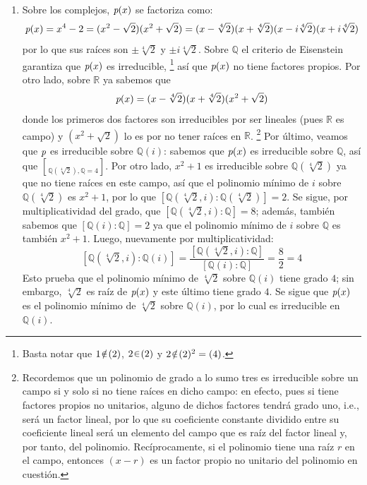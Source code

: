 \begin{sol}\hphantom{x}
\begin{enumerate}[label=\alph*)]
\item 
Sobre los complejos, $\operatorname{\textit{p}}(x)$ se factoriza como:
\[
\operatorname{\textit{p}}(x) = x^4 - 2 = (x^2-\sqrt{2})(x^2+\sqrt{2}) = (x-\sqrt[4]{2})(x+\sqrt[4]{2})(x-i\sqrt[4]{2})(x+i\sqrt[4]{2})
\]
por lo que sus raíces son $\pm\sqrt[4]{2}$ y $\pm i\sqrt[4]{2}$. Sobre $\mathbb{Q}$ el criterio de Eisenstein garantiza que $\operatorname{\textit{p}}(x)$ es irreducible,%
\footnote{
    Basta notar que $1\noten(2)$, $2\en(2)$ y $2\noten(2)^2 = (4)$.
} %
así que $\operatorname{\textit{p}}(x)$ no tiene factores propios. Por otro lado, sobre $\mathbb{R}$ ya sabemos que 
\[
\operatorname{\textit{p}}(x) = (x-\sqrt[4]{2})(x+\sqrt[4]{2})(x^2+\sqrt{2})
\]
donde los primeros dos factores son irreducibles por ser lineales (pues $\mathbb{R}$ es campo) y $(x^2+\sqrt{2})$ lo es por no tener raíces en $\mathbb{R}$.%
\footnote{
    Recordemos que un polinomio de grado a lo sumo tres es irreducible sobre un campo si y solo si no tiene raíces en dicho campo: en efecto, pues si tiene factores propios no unitarios, alguno de dichos factores tendrá grado uno, i.e., será un factor lineal, por lo que su coeficiente constante dividido entre su coeficiente lineal será un elemento del campo que es raíz del factor lineal y, por tanto, del polinomio. Recíprocamente, si el polinomio tiene una raíz $r$ en el campo, entonces $(x-r)$ es un factor propio no unitario del polinomio en cuestión.
} %
Por último, veamos que $\operatorname{\textit{p}}$ es irreducible sobre $\mathbb{Q}(i)$: sabemos que $\operatorname{\textit{p}}(x)$ es irreducible sobre $\mathbb{Q}$, así que $\brack{\mathbb{Q}(\sqrt[4]{2}),\mathbb{Q}} = 4$. Por otro lado, $x^2+1$ es irreducible sobre $\mathbb{Q}(\sqrt[4]{2})$ ya que no tiene raíces en este campo, así que el polinomio mínimo de $i$ sobre $\mathbb{Q}(\sqrt[4]{2})$ es $x^2+1$, por lo que $[\mathbb{Q}(\sqrt[4]{2},i) : \mathbb{Q}(\sqrt[4]{2})] = 2$. Se sigue, por multiplicatividad del grado, que $[\mathbb{Q}(\sqrt[4]{2},i) : \mathbb{Q}] = 8$; además, también sabemos que $[\mathbb{Q}(i) : \mathbb{Q}] =2$ ya que el polinomio mínimo de $i$ sobre $\mathbb{Q}$ es también $x^2+1$.
Luego, nuevamente por multiplicatividad:
\[
[\mathbb{Q}(\sqrt[4]{2},i) : \mathbb{Q}(i)]%
= \frac{[\mathbb{Q}(\sqrt[4]{2},i) : \mathbb{Q}]}{[\mathbb{Q}(i) : \mathbb{Q}]}%
= \frac{8}{2} = 4
\]
Esto prueba que el polinomio mínimo de $\sqrt[4]{2}$ sobre $\mathbb{Q}(i)$ tiene grado $4$; sin embargo, $\sqrt[4]{2}$ es raíz de $\operatorname{\textit{p}}(x)$ y este último tiene grado $4$. Se sigue que $\operatorname{\textit{p}}(x)$ es el polinomio mínimo de $\sqrt[4]{2}$ sobre $\mathbb{Q}(i)$, por lo cual es irreducible en $\mathbb{Q}(i)$.


\end{enumerate}
\end{sol}
